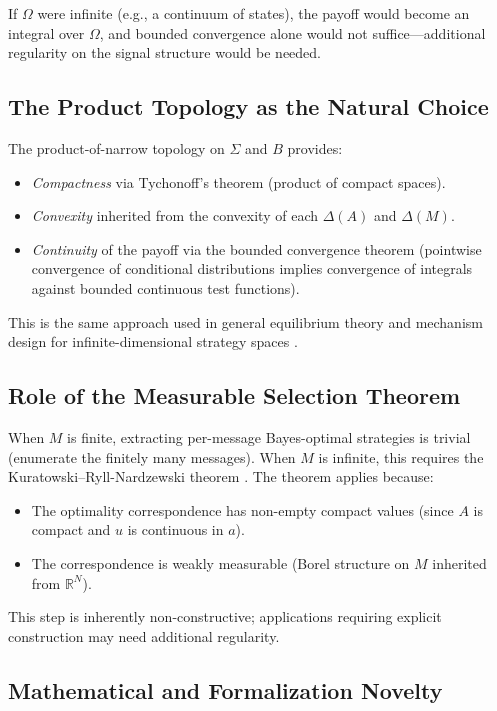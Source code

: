 \documentclass[11pt,a4paper]{article}
\theoremstyle{definition}
\newcommand{\R}{\mathbb{R}}
\newcommand{\DeltaA}{\Delta(A)}
\newcommand{\DeltaM}{\Delta(M)}
\begin{document}
If $\Omega$ were infinite (e.g., a continuum of states), the payoff would become an integral over $\Omega$, and bounded convergence alone would not suffice---additional regularity on the signal structure would be needed.

\subsection{The Product Topology as the Natural Choice}

The product-of-narrow topology on $\Sigma$ and $B$ provides:
\begin{itemize}
  \item \emph{Compactness} via Tychonoff's theorem (product of compact spaces).
  \item \emph{Convexity} inherited from the convexity of each $\DeltaA$ and $\DeltaM$.
  \item \emph{Continuity} of the payoff via the bounded convergence theorem (pointwise convergence of conditional distributions implies convergence of integrals against bounded continuous test functions).
\end{itemize}
This is the same approach used in general equilibrium theory and mechanism design for infinite-dimensional strategy spaces \citep{aliprantis2006infinite}.

\subsection{Role of the Measurable Selection Theorem}

When $M$ is finite, extracting per-message Bayes-optimal strategies is trivial (enumerate the finitely many messages).
When $M$ is infinite, this requires the Kuratowski--Ryll-Nardzewski theorem \citep{kuratowski1965general}.
The theorem applies because:
\begin{itemize}
  \item The optimality correspondence has non-empty compact values (since $A$ is compact and $u$ is continuous in $a$).
  \item The correspondence is weakly measurable (Borel structure on $M$ inherited from $\R^N$).
\end{itemize}
This step is inherently non-constructive; applications requiring explicit construction may need additional regularity.

\subsection{Mathematical and Formalization Novelty}
\end{document}
